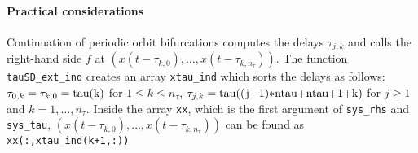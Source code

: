 \documentclass[11pt]{scrartcl}
\newcommand{\R}{\mathbb{R}}
\newcommand{\mlvar}[1]{\lstinline[keywordstyle=\color{var}]!#1!}
\newcommand{\blist}[1]{\mbox{\lstinline!#1!}}
\begin{document}


\paragraph{Practical considerations} Continuation of periodic orbit
bifurcations computes the delays $\tau_{j,k}$ and calls the right-hand
side $f$ at $(x(t-\tau_{k,0}),\ldots,x(t-\tau_{k,n_\tau}))$. The
function \mlvar{tauSD_ext_ind} creates an array \mlvar{xtau_ind} which
sorts the delays as follows: $\tau_{0,k}=\tau_{k,0}=\blist{tau(k)}$
for $1\leq k\leq n_\tau$,
$\tau_{j,k}=\blist{tau((j-1)*ntau+ntau+1+k)}$ for $j\geq1$ and
$k=1,\ldots,n_\tau$. Inside the array \mlvar{xx}, which is the first
argument of \blist{sys_rhs} and \blist{sys_tau},
$(x(t-\tau_{k,0}),\ldots,x(t-\tau_{k,n_\tau}))$ can be found as
\blist{xx(:,xtau_ind(k+1,:))}
\end{document}
